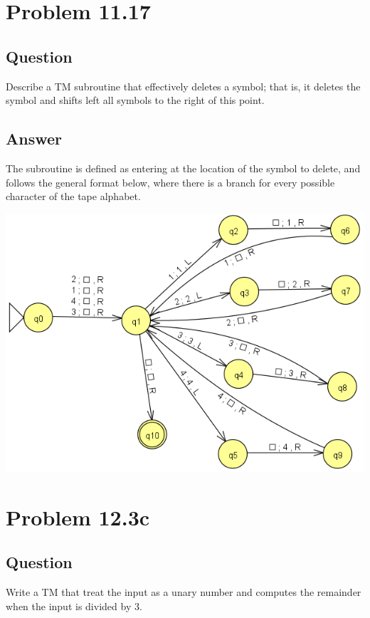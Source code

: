 \documentclass[12pt, a4paper]{article}
\begin{document}
\section{Problem 11.17}
\subsection{Question}
Describe a TM subroutine that effectively deletes a symbol; that is, it deletes the symbol and shifts left all symbols to the right of this point.
\subsection{Answer}
The subroutine is defined as entering at the location of the symbol to delete, and follows the general format below, where there is a branch for every possible character of the tape alphabet.
\begin{center}
\includegraphics[scale=1]{11.17}
\end{center}

\section{Problem 12.3c}
\subsection{Question}
Write a TM that treat the input as a unary number and computes the remainder when the input is divided by 3.
\end{document}
